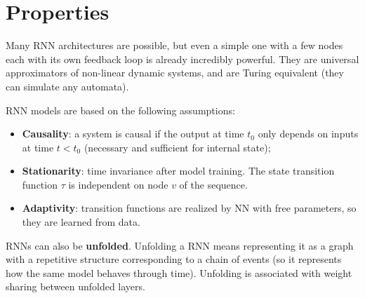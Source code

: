 \section{Properties}

Many RNN architectures are possible, but even a simple one with a few nodes each with its own feedback loop is already incredibly powerful. They are universal approximators of non-linear dynamic systems, and are Turing equivalent (they can simulate any automata).

RNN models are based on the following assumptions:
\begin{itemize}
    \item \textbf{Causality}: a system is causal if the output at time $t_0$ only depends on inputs at time $t<t_0$ (necessary and sufficient for internal state);

    \item \textbf{Stationarity}: time invariance after model training. The state transition function $\tau$ is independent on node $v$ of the sequence.

    \item \textbf{Adaptivity}: transition functions are realized by NN with free parameters, so they are learned from data.
\end{itemize}

RNNs can also be \textbf{unfolded}. Unfolding a RNN means representing it as a graph with a repetitive structure corresponding to a chain of events (so it represents how the same model behaves through time). Unfolding is associated with weight sharing between unfolded layers.